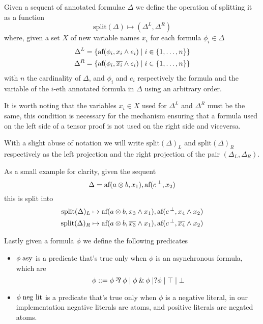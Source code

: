 \documentclass[a4paper, 12pt, tesi, english]{report}
\begin{document}
\begin{define}
	Given a sequent of annotated formulae $\Delta$ we define the operation of splitting it as a function
	$$ \text{split}(\Delta) \mapsto (\Delta^L, \Delta^R) $$
	where, given a set $X$ of new variable names $x_i$ for each formula $\phi_i \in \Delta$
	\begin{align*}
		\Delta^L &= \{ \text{af}(\phi_i, x_i \wedge e_i) \mid i \in \{1, \dots, n\}\} \\
		\Delta^R &= \{ \text{af}(\phi_i, \overline{x_i} \wedge e_i) \mid i \in \{1, \dots, n\}\} \\
	\end{align*}
	with $n$ the cardinality of $\Delta$, and $\phi_i$ and $e_i$ respectively the formula and the variable of the $i$-eth annotated formula in $\Delta$ using an arbitrary order.

	It is worth noting that the variables $x_i \in X$ used for $\Delta^L$ and $\Delta^R$ must be the same, this condition is necessary for the mechanism ensuring that a formula used on the left side of a tensor proof is not used on the right side and viceversa.

	With a slight abuse of notation we will write $\text{split}(\Delta)_L$ and $\text{split}(\Delta)_R$ respectively as the left projection and the right projection of the pair $(\Delta_L, \Delta_R)$.
\end{define}
As a small example for clarity, given the sequent
$$ \Delta = \text{af}(a \otimes b, x_1), \text{af}({c}\,^{\bot}, x_2) $$
this is split into
\begin{align*}
	\text{split}(\Delta)_L &\mapsto \text{af}(a \otimes b, x_3 \wedge x_1), \text{af}({c}\,^{\bot}, x_4 \wedge x_2) \\
	\text{split}(\Delta)_R &\mapsto \text{af}(a \otimes b, \overline{x_3} \wedge x_1), \text{af}({c}\,^{\bot}, \overline{x_4} \wedge x_2) 
\end{align*}

\begin{define}
	Lastly given a formula $\phi$ we define the following predicates
	\begin{itemize}
		\item $\phi \; \text{asy}$ is a predicate that's true only when $\phi$ is an asynchronous formula, which are
			$$ \phi ::= \phi \llpar \phi \mid \phi \llwith \phi \mid \llwn{\phi} \mid  \lltop \mid \llbot $$
		\item $\phi \; \text{neg lit}$ is a predicate that's true only when $\phi$ is a negative literal, in our implementation negative literals are atoms, and positive literals are negated atoms.
	\end{itemize}
\end{define}
\end{document}
